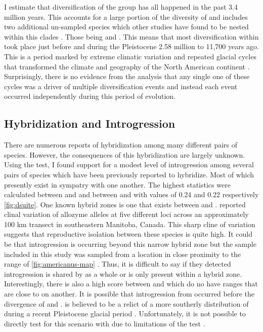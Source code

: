 I estimate that diversification of the \americanus group has all happened in the 
past 3.4 million years. This accounts for a large portion of the diversity of  
\anaxyrus and includes two additional un-sampled species which other studies  
have found to be nested within this clades \cite{portik2023,pyron2011}. 
Those being \houstonensis and \californicus.
This means that most diversification within \anaxyrus took place just before  
and during the Pleistocene 2.58 million to 11,700 years ago. 
This is a period marked by extreme climatic variation and repeated glacial cycles 
that transformed the climate and geography of the North American continent \parencite{holman1995,holman2003}.
Surprisingly, there is no evidence from the \phycoeval analysis that any single 
one of these cycles was a driver of multiple diversification events and instead 
each event occurred independently during this period of \anaxyrus evolution.

\subsection{Hybridization and Introgression}
There are numerous reports of hybridization among many different pairs of 
\anaxyrus species. 
However, the consequences of this hybridization are largely unknown. 
Using the \fbranch test, I found support for a modest level of introgression 
among several pairs of species which have been previously reported to hybridize. 
Most of which presently exist in sympatry with one another.
The highest \fbranch statistics were calculated between \amer and \hemiophrys and 
between \amer and \baxteri with values of 0.24 and 0.22 respectively \cref{fig:dsuite}.
One known \anaxyrus hybrid zones is one that exists between \amer and \hemiophrys.
\cite{green1983} reported clinal variation of allozyme alleles at five different 
loci across an approximately 100 km transect in southeastern Manitoba, Canada.
This sharp cline of variation suggests that reproductive isolation between these
species is quite high. 
It could be that introgression is occurring beyond this narrow hybrid zone
but the sample included in this study was sampled from a location in close 
proximity to the range of \amer \cref{fig:americanus-map} \parencite{conant1998}.
Thus, it is difficult to say if they detected introgression is shared by 
\hemiophrys as a whole or is only present within a hybrid zone.
Interestingly, there is also a high \fbranch score between \amer and \baxteri
which do no have ranges that are close to on another. 
It is possible that introgression from \amer occurred before the divergence  
of \hemiophrys and \baxteri. 
\baxteri is believed to be a relict of a more southerly distribution of 
\hemiophrys during a recent Pleistocene glacial period \parencite{henrich1968}.
Unfortunately, it is not possible to directly test for this scenario with \dsuite
due to limitations of the \fbranch test \parencite{malinsky2021}.

